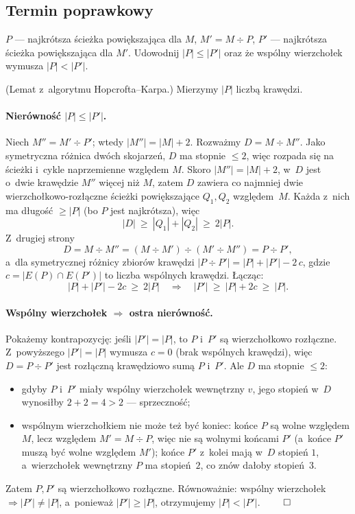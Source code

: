 \subsection{Termin poprawkowy}

\begin{zadanie}
	$P$ --- najkrótsza ścieżka powiększająca dla $M$, $M'=M\div P$, $P'$ ---
	najkrótsza ścieżka powiększająca dla $M'$. Udowodnij $|P|\le|P'|$ oraz że
	wspólny wierzchołek wymusza $|P|<|P'|$.
\end{zadanie}

(Lemat z~algorytmu Hopcrofta--Karpa.) Mierzymy $|P|$ liczbą krawędzi.

\paragraph{Nierówność $|P|\le|P'|$.}
Niech $M''=M'\div P'$; wtedy $|M''|=|M|+2$. Rozważmy $D=M\div M''$. Jako
symetryczna różnica dwóch skojarzeń, $D$ ma stopnie $\le 2$, więc rozpada się na
ścieżki i~cykle naprzemienne względem $M$. Skoro $|M''|=|M|+2$, w~$D$ jest o~dwie
krawędzie $M''$ więcej niż $M$, zatem $D$ zawiera co najmniej dwie
wierzchołkowo-rozłączne ścieżki powiększające $Q_1,Q_2$ względem~$M$. Każda
z~nich ma długość $\ge|P|$ (bo $P$ jest najkrótsza), więc
\[
	|D|\ \ge\ |Q_1|+|Q_2|\ \ge\ 2|P|.
\]
Z~drugiej strony
\[
	D=M\div M''=(M\div M')\div(M'\div M'')=P\div P',
\]
a~dla symetrycznej różnicy zbiorów krawędzi
$|P\div P'|=|P|+|P'|-2\,c$, gdzie $c=|E(P)\cap E(P')|$ to liczba wspólnych
krawędzi. Łącząc:
\[
	|P|+|P'|-2c\ \ge\ 2|P|
	\quad\Longrightarrow\quad
	|P'|\ \ge\ |P|+2c\ \ge\ |P|.
\]

\paragraph{Wspólny wierzchołek $\Rightarrow$ ostra nierówność.}
Pokażemy kontrapozycję: jeśli $|P'|=|P|$, to $P$ i~$P'$ są wierzchołkowo
rozłączne. Z~powyższego $|P'|=|P|$ wymusza $c=0$ (brak wspólnych krawędzi),
więc $D=P\div P'$ jest rozłączną krawędziowo sumą $P$ i~$P'$. Ale $D$ ma stopnie
$\le 2$:
\begin{itemize}[nosep]
	\item gdyby $P$ i~$P'$ miały wspólny wierzchołek wewnętrzny $v$, jego stopień
	      w~$D$ wynosiłby $2+2=4>2$ --- sprzeczność;
	\item wspólnym wierzchołkiem nie może też być koniec: końce $P$ są wolne
	      względem $M$, lecz  względem $M'=M\div P$, więc nie są
	      wolnymi końcami $P'$ (a~końce $P'$ muszą być wolne względem $M'$); końce
	      $P'$ z~kolei mają w~$D$ stopień $1$, a~wierzchołek wewnętrzny $P$ ma
	      stopień~$2$, co znów dałoby stopień~$3$.
\end{itemize}
Zatem $P,P'$ są wierzchołkowo rozłączne. Równoważnie: wspólny wierzchołek
$\Rightarrow |P'|\ne|P|$, a~ponieważ $|P'|\ge|P|$, otrzymujemy $|P|<|P'|$. $\qed$

